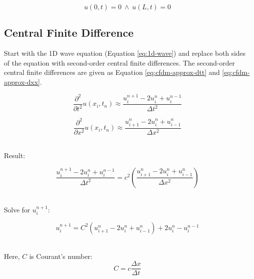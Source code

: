 \documentclass{article}
\begin{document}
\begin{equation}
    u(0,t)=0\ \wedge\ u(L,t)=0
    \label{eq:bc}
\end{equation}

\subsection{Central Finite Difference}


Start with the 1D wave equation (Equation \ref{eq:1d-wave}) and replace both sides of the equation with second-order central finite differences. The second-order central finite differences are given as Equation \ref{eq:cfdm-approx-dtt} and \ref{eq:cfdm-approx-dxx}.

\begin{equation}
    \frac{\partial^2}{\partial t^2}u(x_i,t_n)\approx \frac{u_i^{n+1}-2u_i^n+u_i^{n-1}}{\Delta t^2}
    \label{eq:cfdm-approx-dtt}
\end{equation}

\begin{equation}
    \frac{\partial^2}{\partial x^2}u(x_i,t_n)\approx \frac{u_{i+1}^{n}-2u_i^n+u_{i-1}^{n}}{\Delta x^2}
    \label{eq:cfdm-approx-dxx}
\end{equation}

\newpage
\noindent\\Result:

\begin{equation}
    \frac{u_i^{n+1}-2u_i^n+u_i^{n-1}}{\Delta t^2}
    = c^2\left(
    \frac{u_{i+1}^{n}-2u_i^n+u_{i-1}^{n}}{\Delta x^2}
    \right)
    \label{}
\end{equation}

\noindent\\Solve for $u_i^{n+1}$:

\begin{equation}
    u_i^{n+1} = C^2(u_{i+1}^n - 2u_i^n + u_{i-1}^n) + 2u_i^n-u_i^{n-1}
    \label{eq:cfdm}
\end{equation}

\noindent\\Here, $C$ is Courant's number:
\begin{equation}
    C=c\frac{\Delta x}{\Delta t}
\end{equation}
\end{document}
